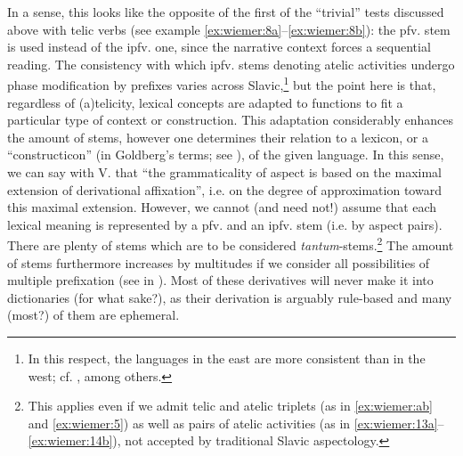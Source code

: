 \documentclass[output=paper]{langscibook}
\begin{document}
In a sense, this looks like the opposite of the first of the “trivial” tests discussed above with telic verbs (see example \ref{ex:wiemer:8a}--\ref{ex:wiemer:8b}): the pfv. stem is used instead of the ipfv. one, since the narrative context forces a sequential reading. The consistency with which ipfv. stems denoting atelic activities undergo phase modification by prefixes varies across Slavic,\footnote{In this respect, the languages in the east are more consistent than in the west; cf. \citet[141--230]{Petruxina2000}, among others.} but the point here is that, regardless of (a)telicity, lexical concepts are adapted to functions to fit a particular type of context or construction. This adaptation considerably enhances the amount of stems, however one determines their relation to a lexicon, or a ``constructicon'' (in Goldberg’s terms; see ), of the given language. In this sense, we can say with V. \textcites[229]{Lehmann1999}[174]{Lehmann2004b} that “the grammaticality of aspect is based on the maximal extension of derivational affixation”, i.e. on the degree of approximation toward this maximal extension. However, we cannot (and need not!) assume that each lexical meaning is represented by a pfv. and an ipfv. stem (i.e. by aspect pairs). There are plenty of stems which are to be considered \textit{tantum}{}-stems.\footnote{This applies even if we admit telic and atelic triplets (as in \ref{ex:wiemer:ab} and \ref{ex:wiemer:5}) as well as pairs of atelic activities (as in \ref{ex:wiemer:13a}--\ref{ex:wiemer:14b}), not accepted by traditional Slavic aspectology.} The amount of stems furthermore increases by multitudes if we consider all possibilities of multiple prefixation (see  in ). Most of these derivatives will never make it into dictionaries (for what sake?), as their derivation is arguably rule-based and many (most?) of them are ephemeral.
\end{document}
